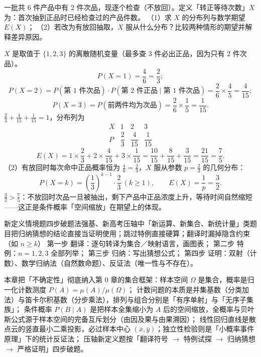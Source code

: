 \begin{explore}
\begin{problem}
一批共 $6$ 件产品中有 $2$ 件次品，现逐个检查（不放回）。定义「转正等待次数」$X$ 为：首次抽到正品时已经检查过的产品件数。
（1）求 $X$ 的分布列与数学期望 $E(X)$；
（2）若改为有放回抽取，$X$ 服从什么分布？比较两种情形的期望并解释差异原因。
\end{problem}
\begin{solution}
$X$ 是取值于 $\{1,2,3\}$ 的离散随机变量（最多查 3 件必出正品，因为只有 2 件次品）。
\[
  P(X=1)=\frac{4}{6}=\frac{2}{3};
\]
\[
  P(X=2)=P(\text{第 1 件次品})\cdot P(\text{第 2 件正品}\mid\text{第 1 件次品})
  =\frac{2}{6}\times\frac{4}{5}=\frac{4}{15};
\]
\[
  P(X=3)=P(\text{前两件均为次品})=\frac{2}{6}\times\frac{1}{5}=\frac{1}{15}.
\]
$\frac23+\frac{4}{15}+\frac{1}{15}=1$，分布列为
\[
  \begin{array}{c|ccc}
    X & 1 & 2 & 3\\\hline
    P & \dfrac{2}{3} & \dfrac{4}{15} & \dfrac{1}{15}
  \end{array}
\]
\[
  E(X)=1\times\frac{2}{3}+2\times\frac{4}{15}+3\times\frac{1}{15}
  =\frac{10}{15}+\frac{8}{15}+\frac{3}{15}=\frac{21}{15}=\frac{7}{5}.
\]
（2）有放回时每次命中正品概率恒为 $\frac{4}{6}=\frac23$，$X$ 服从参数 $p=\frac23$ 的几何分布：
\[
  P(X=k)=\left(\frac{1}{3}\right)^{k-1}\cdot\frac{2}{3}\ (k\ge1),\qquad E(X)=\frac{1}{p}=\frac{3}{2}.
\]
$\frac{3}{2}>\frac{7}{5}$：不放回时次品一旦被抽出，剩下产品中正品浓度上升，等待时间自然缩短——这正是条件概率「空间缩放」在期望上的体现。
\end{solution}

\begin{conccard}[二级]{新定义情境题四步破题法}{强基、新高考压轴中「新运算、新集合、新统计量」类题目}{把归纳猜想的结论直接当证明使用；跳过特例直接硬算；翻译时漏掉隐含约束（如 $n\ge k$）}
第一步 翻译：逐句转译为集合／映射语言，画图表；
第二步 特例：$n=1,2,3$ 全部列举；
第三步 归纳：写出猜想公式；
第四步 证明：双射（计数）、数学归纳法（自然数命题）、反证法（唯一性与不存在）。
\end{conccard}

\begin{summary}
本章把「不确定性」彻底纳入第 0 章的集合框架：样本空间 $\Omega$ 是集合，概率是归一化计数测度 $P(A)=\mu(A)/\mu(\Omega)$；
计数问题的本质是并集基数（分类加法）与笛卡尔积基数（分步乘法），排列与组合分别是「有序单射」与「无序子集族」；
条件概率 $P(B\mid A)$ 是把样本全集缩小为 $A$ 后的空间缩放，全概率与贝叶斯公式源于样本空间的完备互斥划分（由因及果与由果溯因）；
线性回归直线是散点云的竖直最小二乘投影，必过样本中心 $(\bar x,\bar y)$；独立性检验则是「小概率事件原理」下的统计反证法；
压轴新定义题按「翻译符号 $\to$ 特例试探 $\to$ 归纳猜想 $\to$ 严格证明」四步破题。


\end{summary}
\end{explore}
